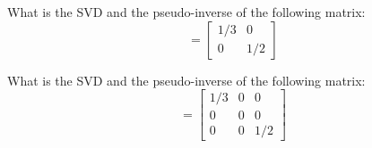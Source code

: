 \bexo
What is the SVD and the pseudo-inverse of the following matrix:
\begin{equation}
[\tb{M}]=\left[
\begin{array}{cc}
1/3&0\\
0&1/2
\end{array}
\right]
\end{equation}

What is the SVD and the pseudo-inverse of the following matrix:
\begin{equation}
[\tb{M}']=\left[
\begin{array}{ccc}
1/3&0&0\\
0&0&0\\
0 & 0 &1/2
\end{array}
\right]
\end{equation}



\eexo
\solution{ 
}